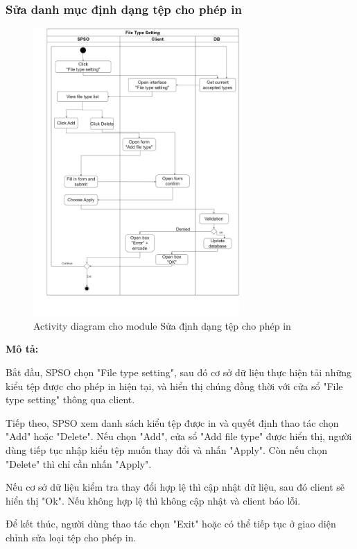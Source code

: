 \subsubsection{Sửa danh mục định dạng tệp cho phép in}
\begin{figure}[H]
    \begin{center}
        \includegraphics[width=0.7\textwidth]{Images/System Modelling/FileTypeSetting_Activity.png}
        \caption{Activity diagram cho module Sửa định dạng tệp cho phép in}
        \label{fig:arch}
    \end{center}
\end{figure}

\textbf{Mô tả:}\par
Bắt đầu, SPSO chọn "File type setting", sau đó cơ sở dữ liệu thực hiện tải những kiểu tệp được cho phép in hiện tại, và hiển thị chúng đồng thời với cửa sổ "File type setting" thông qua client. \par
Tiếp theo, SPSO xem danh sách kiểu tệp được in và quyết định thao tác chọn "Add" hoặc "Delete". Nếu chọn "Add", cửa sổ "Add file type" được hiển thị, người dùng tiếp tục nhập kiểu tệp muốn thay đổi và nhấn "Apply". Còn nếu chọn "Delete" thì chỉ cần nhấn "Apply".\par
Nếu cơ sở dữ liệu kiểm tra thay đổi hợp lệ thì cập nhật dữ liệu, sau đó client sẽ hiển thị "Ok". Nếu không hợp lệ thì không cập nhật và client báo lỗi.\par
Để kết thúc, người dùng thao tác chọn "Exit" hoặc có thể tiếp tục ở giao diện chỉnh sửa loại tệp cho phép in.

